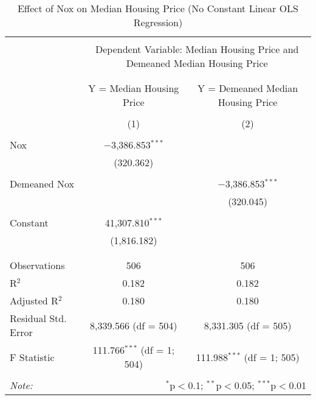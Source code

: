 
\begin{table}[!htbp] \centering 
  \caption{Effect of Nox on Median Housing Price (No Constant Linear OLS Regression)} 
  \label{} 
\begin{tabular}{@{\extracolsep{5pt}}lcc} 
\\[-1.8ex]\hline 
\hline \\[-1.8ex] 
 & \multicolumn{2}{c}{Dependent Variable: Median Housing Price and Demeaned Median Housing Price} \\ 
\cline{2-3} 
\\[-1.8ex] &  &  \\ 
 & Y = Median Housing Price & Y = Demeaned Median Housing Price \\ 
\\[-1.8ex] & (1) & (2)\\ 
\hline \\[-1.8ex] 
 Nox & $-$3,386.853$^{***}$ &  \\ 
  & (320.362) &  \\ 
  & & \\ 
 Demeaned Nox &  & $-$3,386.853$^{***}$ \\ 
  &  & (320.045) \\ 
  & & \\ 
 Constant & 41,307.810$^{***}$ &  \\ 
  & (1,816.182) &  \\ 
  & & \\ 
\hline \\[-1.8ex] 
Observations & 506 & 506 \\ 
R$^{2}$ & 0.182 & 0.182 \\ 
Adjusted R$^{2}$ & 0.180 & 0.180 \\ 
Residual Std. Error & 8,339.566 (df = 504) & 8,331.305 (df = 505) \\ 
F Statistic & 111.766$^{***}$ (df = 1; 504) & 111.988$^{***}$ (df = 1; 505) \\ 
\hline 
\hline \\[-1.8ex] 
\textit{Note:}  & \multicolumn{2}{r}{$^{*}$p$<$0.1; $^{**}$p$<$0.05; $^{***}$p$<$0.01} \\ 
\end{tabular} 
\end{table} 

